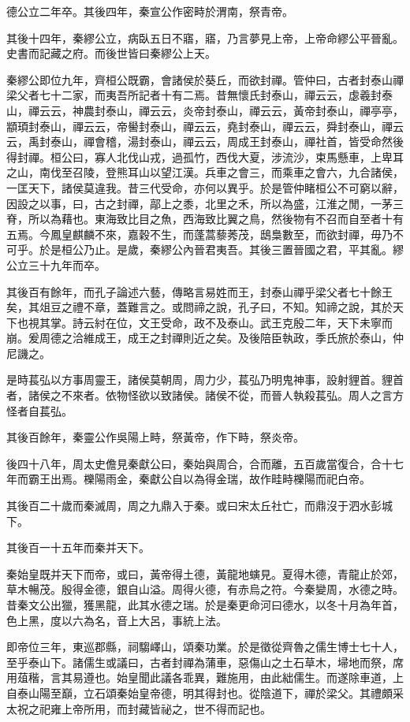 德公立二年卒。其後四年，秦宣公作密畤於渭南，祭青帝。

其後十四年，秦繆公立，病臥五日不寤，寤，乃言夢見上帝，上帝命繆公平晉亂。史書而記藏之府。而後世皆曰秦繆公上天。

秦繆公即位九年，齊桓公既霸，會諸侯於葵丘，而欲封禪。管仲曰，古者封泰山禪梁父者七十二家，而夷吾所記者十有二焉。昔無懷氏封泰山，禪云云，虙羲封泰山，禪云云，神農封泰山，禪云云，炎帝封泰山，禪云云，黃帝封泰山，禪亭亭，顓頊封泰山，禪云云，帝嚳封泰山，禪云云，堯封泰山，禪云云，舜封泰山，禪云云，禹封泰山，禪會稽，湯封泰山，禪云云，周成王封泰山，禪社首，皆受命然後得封禪。桓公曰，寡人北伐山戎，過孤竹，西伐大夏，涉流沙，束馬懸車，上卑耳之山，南伐至召陵，登熊耳山以望江漢。兵車之會三，而乘車之會六，九合諸侯，一匡天下，諸侯莫違我。昔三代受命，亦何以異乎。於是管仲睹桓公不可窮以辭，因設之以事，曰，古之封禪，鄗上之黍，北里之禾，所以為盛，江淮之閒，一茅三脊，所以為藉也。東海致比目之魚，西海致比翼之鳥，然後物有不召而自至者十有五焉。今鳳皇麒麟不來，嘉穀不生，而蓬蒿藜莠茂，鴟梟數至，而欲封禪，毋乃不可乎。於是桓公乃止。是歲，秦繆公內晉君夷吾。其後三置晉國之君，平其亂。繆公立三十九年而卒。

其後百有餘年，而孔子論述六藝，傳略言易姓而王，封泰山禪乎梁父者七十餘王矣，其俎豆之禮不章，蓋難言之。或問禘之說，孔子曰，不知。知禘之說，其於天下也視其掌。詩云紂在位，文王受命，政不及泰山。武王克殷二年，天下未寧而崩。爰周德之洽維成王，成王之封禪則近之矣。及後陪臣執政，季氏旅於泰山，仲尼譏之。

是時萇弘以方事周靈王，諸侯莫朝周，周力少，萇弘乃明鬼神事，設射貍首。貍首者，諸侯之不來者。依物怪欲以致諸侯。諸侯不從，而晉人執殺萇弘。周人之言方怪者自萇弘。

其後百餘年，秦靈公作吳陽上畤，祭黃帝，作下畤，祭炎帝。

後四十八年，周太史儋見秦獻公曰，秦始與周合，合而離，五百歲當復合，合十七年而霸王出焉。櫟陽雨金，秦獻公自以為得金瑞，故作畦畤櫟陽而祀白帝。

其後百二十歲而秦滅周，周之九鼎入于秦。或曰宋太丘社亡，而鼎沒于泗水彭城下。

其後百一十五年而秦并天下。

秦始皇既并天下而帝，或曰，黃帝得土德，黃龍地螾見。夏得木德，青龍止於郊，草木暢茂。殷得金德，銀自山溢。周得火德，有赤烏之符。今秦變周，水德之時。昔秦文公出獵，獲黑龍，此其水德之瑞。於是秦更命河曰德水，以冬十月為年首，色上黑，度以六為名，音上大呂，事統上法。

即帝位三年，東巡郡縣，祠騶嶧山，頌秦功業。於是徵從齊魯之儒生博士七十人，至乎泰山下。諸儒生或議曰，古者封禪為蒲車，惡傷山之土石草木，埽地而祭，席用葅稭，言其易遵也。始皇聞此議各乖異，難施用，由此絀儒生。而遂除車道，上自泰山陽至巔，立石頌秦始皇帝德，明其得封也。從陰道下，禪於梁父。其禮頗采太祝之祀雍上帝所用，而封藏皆祕之，世不得而記也。

